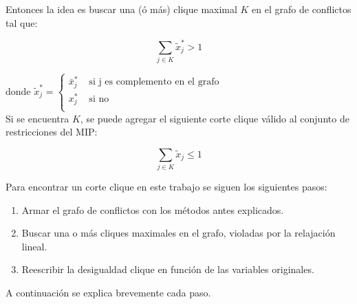 Entonces la idea es buscar una (ó más) clique maximal $K$ en el grafo de conflictos tal que: 

$$\sum_{j\in K}\tilde{x}^*_j > 1$$

donde 
$\tilde{x}^*_j = 
\begin{cases}
\bar{x}^*_j & \text{ si j es complemento en el grafo}\\
x^*_j & \text{ si no}\\
\end{cases}$\\

Si se encuentra $K$, se puede agregar el siguiente corte clique v\'alido al conjunto de restricciones del MIP:

$$\sum_{j\in K}\tilde{x}_j \leq 1$$

Para encontrar un corte clique en este trabajo se siguen los siguientes pasos:

\begin{enumerate}
\item Armar el grafo de conflictos con los métodos antes explicados.
\item Buscar una o m\'as cliques maximales en el grafo, violadas por la relajaci\'on lineal.
\item Reescribir la desigualdad clique en función de las variables originales.
\end{enumerate}

A continuaci\'on se explica brevemente cada paso.
\newpage

